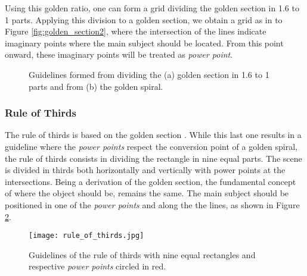Using this golden ratio, one can form a grid dividing the golden section in 1.6 to 1 parts. Applying this division to a golden section, we obtain a grid as in to Figure \ref{fig:golden_section2}, where the intersection of the lines indicate imaginary points where the main subject should be located. From this point onward, these imaginary points will be treated as \emph{power point}. 



\begin{figure}[htbp]
        \centering
  \caption{Guidelines formed from dividing the (a) golden section in 1.6 to 1 parts and from (b) the golden spiral.}
  \label{fig:golden_section_image}
\end{figure}

\subsubsection{Rule of Thirds}
\label{subsub:rule_thirds}

The rule of thirds is based on the golden section \cite{Santos}. While this last one results in a guideline where the \emph{power points} respect the conversion point of a golden spiral, the rule of thirds consists in dividing the rectangle in nine equal parts. The scene is divided in thirds both horizontally and vertically with power points at the intersections.
Being a derivation of the golden section, the fundamental concept of where the object should be, remains the same. The main subject should be positioned in one of the \emph{power points} and along the the lines, as shown in Figure \ref{fig:rule_of_thirds_image}.

\begin{figure}[htbp]
    \centering
	\label{fig:rule_of_thirds_example}
    \texttt{[image: rule\_of\_thirds.jpg]}
	\caption{Guidelines of the rule of thirds with nine equal rectangles and respective \emph{power points} circled in red.}
	\label{fig:rule_of_thirds_image}
\end{figure}

